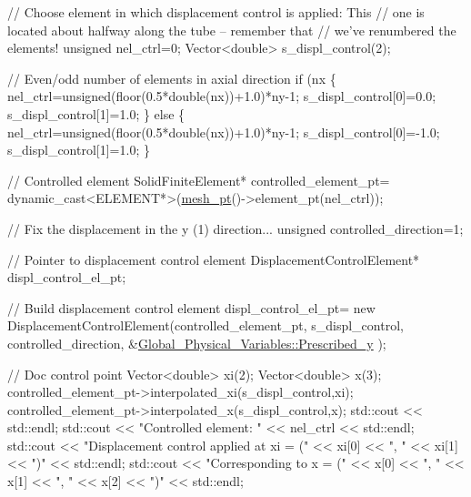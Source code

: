 \begin{DoxyCodeInclude}
 \textcolor{comment}{// Choose element in which displacement control is applied: This}
 \textcolor{comment}{// one is located about halfway along the tube -- remember that}
 \textcolor{comment}{// we've renumbered the elements!}
 \textcolor{keywordtype}{unsigned} nel\_ctrl=0;
 Vector<double> s\_displ\_control(2);

 \textcolor{comment}{// Even/odd number of elements in axial direction}
 \textcolor{keywordflow}{if} (nx%
  \{
   nel\_ctrl=unsigned(floor(0.5*\textcolor{keywordtype}{double}(nx))+1.0)*ny-1;
   s\_displ\_control[0]=0.0;
   s\_displ\_control[1]=1.0;
  \}
 \textcolor{keywordflow}{else}
  \{
   nel\_ctrl=unsigned(floor(0.5*\textcolor{keywordtype}{double}(nx))+1.0)*ny-1;
   s\_displ\_control[0]=-1.0;
   s\_displ\_control[1]=1.0;
  \}

 \textcolor{comment}{// Controlled element}
 SolidFiniteElement* controlled\_element\_pt=
  \textcolor{keyword}{dynamic\_cast<}ELEMENT*\textcolor{keyword}{>}(\hyperlink{classShellProblem_a1905a1b913469ed54f7c8f55d133ff57}{mesh\_pt}()->element\_pt(nel\_ctrl));
 

 \textcolor{comment}{// Fix the displacement in the y (1) direction...}
 \textcolor{keywordtype}{unsigned} controlled\_direction=1;

 \textcolor{comment}{// Pointer to displacement control element}
 DisplacementControlElement* displ\_control\_el\_pt;
 
 \textcolor{comment}{// Build displacement control element}
 displ\_control\_el\_pt=
  \textcolor{keyword}{new} DisplacementControlElement(controlled\_element\_pt,
                                 s\_displ\_control,
                                 controlled\_direction,
                                 &\hyperlink{namespaceGlobal__Physical__Variables_aa2f7ea98cb8462b3920a026bed5f6099}{Global\_Physical\_Variables::Prescribed\_y}
      );
 

 \textcolor{comment}{// Doc control point}
 Vector<double> xi(2);
 Vector<double> x(3);
 controlled\_element\_pt->interpolated\_xi(s\_displ\_control,xi);
 controlled\_element\_pt->interpolated\_x(s\_displ\_control,x);
 std::cout << std::endl;
 std::cout << \textcolor{stringliteral}{"Controlled element: "} << nel\_ctrl << std::endl;
 std::cout << \textcolor{stringliteral}{"Displacement control applied at xi = ("} 
           << xi[0] << \textcolor{stringliteral}{", "} << xi[1] << \textcolor{stringliteral}{")"} << std::endl;
 std::cout << \textcolor{stringliteral}{"Corresponding to                x  = ("} 
           << x[0] << \textcolor{stringliteral}{", "} << x[1] << \textcolor{stringliteral}{", "} << x[2] << \textcolor{stringliteral}{")"} << std::endl;



\end{DoxyCodeInclude}
